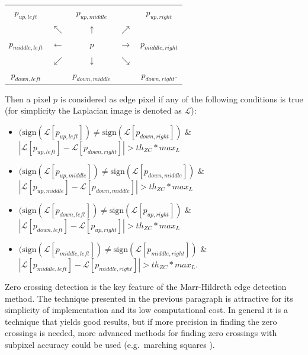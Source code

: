 \documentclass{ipol}
\numberwithin{equation}{section}
\numberwithin{table}{section}
\begin{document}
{\begin{center}
\begin{tabular}{ c c c c c }
	$p_{up,left}$		& 					& $p_{up,middle}$	&					& $p_{up,right}$ 		\\
						& $\nwarrow$		& $\uparrow$		& $\nearrow$		&						\\
	$p_{middle,left}$	& $\leftarrow$		& $p$				& $\rightarrow$		& $p_{middle,right}$	\\
						& $\swarrow$		& $\downarrow$		& $\searrow$		&						\\
	$p_{down,left}$		&					& $p_{down,middle}$	&					& $p_{down,right}$.		\\  
\end{tabular}
\end{center}

Then a pixel $p$ is considered as edge pixel if any of the following conditions is true 
(for simplicity the Laplacian image is denoted as $\mathcal{L}$):
\begin{itemize}
	\item $(\mbox{sign}(\mathcal{L}[p_{up,left}])\neq\mbox{sign}(\mathcal{L}[p_{down,right}])$ \& $|\mathcal{L}[p_{up,left}]-\mathcal{L}[p_{down,right}]|>th_{ZC}*max_L$
	\item $(\mbox{sign}(\mathcal{L}[p_{up,middle}])\neq\mbox{sign}(\mathcal{L}[p_{down,middle}])$ \& $|\mathcal{L}[p_{up,middle}]-\mathcal{L}[p_{down,middle}]|>th_{ZC}*max_L$
	\item $(\mbox{sign}(\mathcal{L}[p_{down,left}])\neq\mbox{sign}(\mathcal{L}[p_{up,right}])$ \& $|\mathcal{L}[p_{down,left}]-\mathcal{L}[p_{up,right}]|>th_{ZC}*max_L$
	\item $(\mbox{sign}(\mathcal{L}[p_{middle,left}])\neq\mbox{sign}(\mathcal{L}[p_{middle,right}])$ \& $|\mathcal{L}[p_{middle,left}]-\mathcal{L}[p_{middle,right}]|>th_{ZC}*max_L$. \\
\end{itemize}

Zero crossing detection is the key feature of the Marr-Hildreth edge detection method. The technique 
presented in the previous paragraph is attractive for its simplicity of implementation and its low 
computational cost. In general it is a technique that yields good results, but if more precision in 
finding the zero crossings is needed, more advanced methods for finding zero crossings with subpixel 
accuracy could be used (e.g.\ marching squares \cite{marching_cubes}).


}
\end{document}
